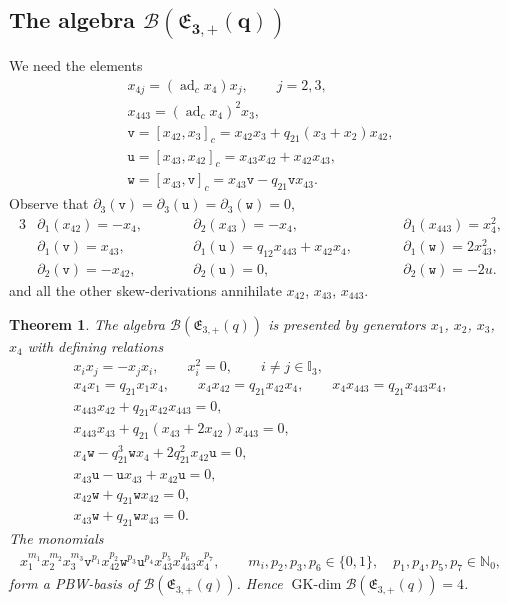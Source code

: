 \documentclass[pdftex]{sigma}
\numberwithin{equation}{section}
\newtheorem{Theorem}{Theorem}[section]
\newcommand{\adc}{\operatorname{ad}_c}
\newcommand{\GK}{\operatorname{GK-dim}}
\newcommand{\toba}{\mathscr B}
\newcommand{\I}{{\mathbb I}}
\newcommand{\N}{{\mathbb N}}
\newcommand{\ut}{\mathtt{u}}
\newcommand{\vt}{\mathtt{v}}
\newcommand{\wt}{\mathtt{w}}
\newcommand{\eny}{\mathfrak{E}}
\begin{document}
\subsection[The algebra B(E\_\{3,+\}(q))]{The algebra $\boldsymbol{\toba(\eny_{3,+}(q))}$}
We need the elements
\begin{gather*}
x_{4j}=(\adc x_4)x_j, \qquad j=2,3,
\\
x_{443} =(\adc x_4)^2x_3,
\\
\vt =[x_{42}, x_3]_c=x_{42}x_3+q_{21}(x_3+x_2)x_{42},
\\
\ut=[x_{43},x_{42}]_c=x_{43}x_{42}+x_{42}x_{43},
\\
\wt=[x_{43},\vt]_c=x_{43}\vt-q_{21}\vt x_{43}.
\end{gather*}
Observe that $\partial_3(\vt)=\partial_3(\ut)=\partial_3(\wt)=0$,
\begin{alignat}{3}
\label{eq:block-pt-1-derivations}
&\partial_1(x_{42})=-x_4,\qquad &&\partial_2(x_{43}) =-x_4, &&\partial_1(x_{443}) =x_4^2,
\\
&\partial_1(\vt)=x_{43}, &&\partial_1(\ut)=q_{12}x_{443}+x_{42}x_4,\qquad &&\partial_1(\wt)=2x_{43}^2,
\\
&\partial_2(\vt)=-x_{42}, &&\partial_2(\ut)=0, &&\partial_2(\wt)=-2u.
\end{alignat}
and all the other skew-derivations annihilate $x_{42}$, $x_{43}$, $x_{443}$.

\begin{Theorem}\label{thm:q=1,q22=1,n=3} The algebra
$\toba(\eny_{3,+}(q))$
is presented by generators $x_1$, $x_2$, $x_3$, $x_4$ with defining relations
\begin{gather}\label{eq:block-pt-1-rels-0}
x_ix_j=-x_jx_i,\qquad x_i^2 = 0, \qquad i\ne j \in\I_3,
\\
\label{eq:block-pt-1-rels-1}
x_4x_1=q_{21}x_1x_4, \qquad x_4x_{42} = q_{21}x_{42}x_4,\qquad x_4x_{443} = q_{21}x_{443}x_4,
\\
\label{eq:block-pt-1-rels-2}
x_{443}x_{42}+q_{21}x_{42}x_{443} =0,
\\
\label{eq:block-pt-1-rels-3}
x_{443}x_{43}+q_{21}(x_{43}+2x_{42})x_{443} =0,
\\
\label{eq:block-pt-1-rels-4}
x_{4}\wt-q_{21}^3\wt x_{4} +2q_{21}^2 x_{42}\ut= 0,
\\
\label{eq:block-pt-1-rels-4prim}
x_{43}\ut-\ut x_{43}+x_{42}\ut = 0,
\\
\label{eq:block-pt-1-rels-5}
x_{42}\wt+q_{21}\wt x_{42} = 0,
\\
\label{eq:block-pt-1-rels-6}
x_{43}\wt+q_{21}\wt x_{43} = 0.
\end{gather}
The monomials
\begin{align}\label{eq:monomials-eny3+}
x_1^{m_1} x_2^{m_2} x_3^{m_3} \vt^{p_1} x_{42}^{p_2} \wt^{p_3} \ut^{p_4} x_{43}^{p_5} x_{443}^{p_6} x_4^{p_7}, \qquad m_i, p_2, p_3, p_6 \in \{0,1\}, \quad p_1, p_4, p_5, p_7 \in\N_0,
\end{align}
form a PBW-basis of $\toba(\eny_{3,+}(q))$.
Hence $\GK \toba(\eny_{3,+}(q)) =4$.
\end{Theorem}
\end{document}
